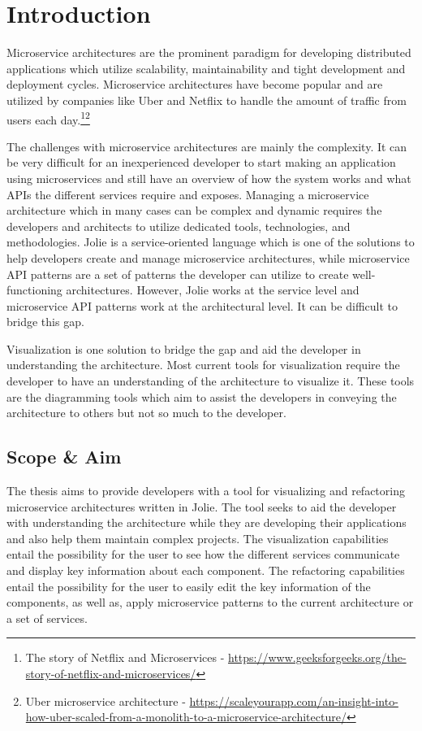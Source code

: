 \chapter{Introduction}
Microservice architectures are the prominent paradigm for developing distributed applications which utilize scalability, maintainability and tight development and deployment cycles.
Microservice architectures have become popular and are utilized by companies like Uber and Netflix
to handle the amount of traffic from users each day.\footnote{The story of Netflix and Microservices - \url{https://www.geeksforgeeks.org/the-story-of-netflix-and-microservices/}}\footnote{Uber microservice architecture - \url{https://scaleyourapp.com/an-insight-into-how-uber-scaled-from-a-monolith-to-a-microservice-architecture/}}

The challenges with microservice architectures are mainly the complexity. It can be very difficult for an inexperienced developer to start making an application using microservices and still have an overview of how the system works and what APIs the different services require and exposes.
Managing a microservice architecture which in many cases can be complex and dynamic requires the developers and architects to utilize dedicated tools, technologies, and methodologies.
Jolie\cite{jolie} is a service-oriented language which is one of the solutions to help developers create and manage microservice architectures, while microservice API patterns\cite*{PatternsForAPIDesign:2022} are a set of patterns the developer can utilize to create well-functioning architectures.
However, Jolie works at the service level and microservice API patterns work at the architectural level. It can be difficult to bridge this gap.

Visualization is one solution to bridge the gap and aid the developer in understanding the architecture.
Most current tools for visualization require the developer to have an understanding of the architecture to visualize it.
These tools are the diagramming tools which aim to assist the developers in conveying the architecture to others but not so much to the developer.

\section{Scope \& Aim}
The thesis aims to provide developers with a tool for visualizing and refactoring microservice architectures written in Jolie. The tool seeks to aid the developer with understanding the architecture while they are developing their applications and also help them maintain complex projects.
The visualization capabilities entail the possibility for the user to see how the different services communicate and display key information about each component.
The refactoring capabilities entail the possibility for the user to easily edit the key information of the components, as well as, apply microservice patterns to the current architecture or a set of services.

